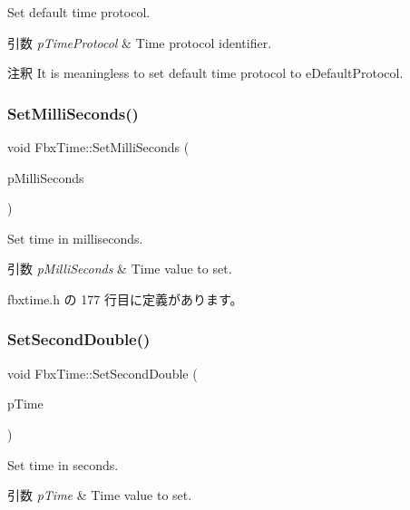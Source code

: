 Set default time protocol. 
\begin{DoxyParams}{引数}
{\em p\+Time\+Protocol} & Time protocol identifier. \\
\hline
\end{DoxyParams}
\begin{DoxyRemark}{注釈}
It is meaningless to set default time protocol to {\ttfamily e\+Default\+Protocol}. 
\end{DoxyRemark}
\mbox{\label{class_fbx_time_a7105d8b5b0665d82660f5ef749cd6274}} 
\subsubsection{\texorpdfstring{Set\+Milli\+Seconds()}{SetMilliSeconds()}}
{\footnotesize\ttfamily void Fbx\+Time\+::\+Set\+Milli\+Seconds (\begin{DoxyParamCaption}\item[{\hyperlink{fbxtypes_8h_ac34da60c22b0a7e1156e5480da7d71f1}{Fbx\+Long\+Long}}]{p\+Milli\+Seconds }\end{DoxyParamCaption})\hspace{0.3cm}{\ttfamily [inline]}}

Set time in milliseconds. 
\begin{DoxyParams}{引数}
{\em p\+Milli\+Seconds} & Time value to set. \\
\hline
\end{DoxyParams}


 fbxtime.\+h の 177 行目に定義があります。

\mbox{\label{class_fbx_time_aa67980a4f73f7914d0c457384754da0c}} 
\subsubsection{\texorpdfstring{Set\+Second\+Double()}{SetSecondDouble()}}
{\footnotesize\ttfamily void Fbx\+Time\+::\+Set\+Second\+Double (\begin{DoxyParamCaption}\item[{double}]{p\+Time }\end{DoxyParamCaption})}

Set time in seconds. 
\begin{DoxyParams}{引数}
{\em p\+Time} & Time value to set. \\
\hline
\end{DoxyParams}
\mbox{\label{class_fbx_time_ae57387b2c14de574b1b7d4361babf033}} 
